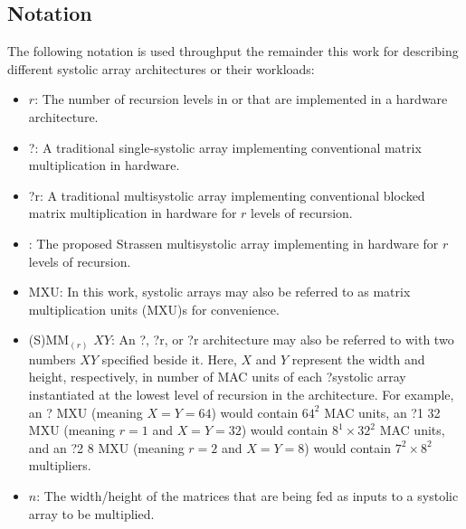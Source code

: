\subsection{Notation}
The following notation is used throughput the remainder this work for describing different systolic array architectures or their workloads:
\begin{itemize}
\item $r$: The number of recursion levels in  or \seq that are implemented in a hardware architecture.
\item \mm?\zero: A traditional single-systolic array implementing conventional matrix multiplication  in hardware.
\item \mm?r: A traditional multisystolic array implementing conventional blocked matrix multiplication  in hardware for $r$ levels of recursion.
\item \smm: The proposed Strassen multisystolic array implementing \seq in hardware for $r$ levels of recursion.
\item MXU: In this work, systolic arrays may also be referred to as matrix multiplication units (MXU)s for convenience.
\item (S)MM$_{(r)}$ $X$\by$Y$: An \mm?\zero, \mm?r, or \smm?r architecture may also be referred to with two numbers $X$\by$Y$ specified beside it.
  Here, $X$ and $Y$ represent the width and height, respectively, in number of MAC units of each \mm?\zero systolic array instantiated at the lowest level of recursion in the architecture.
  For example, an \mm? MXU (meaning $X = Y = 64$) would contain $64^2$ MAC units, an \mm?1 32 MXU (meaning $r = 1$ and $X = Y = 32$) would contain $8^1\times32^2$ MAC units, and an \smmArch?2 8 MXU (meaning $r = 2$ and $X = Y = 8$) would contain $7^2\times8^2$ multipliers.

\item $n$: The width/height of the matrices that are being fed as inputs to a systolic array to be multiplied.
\end{itemize}
